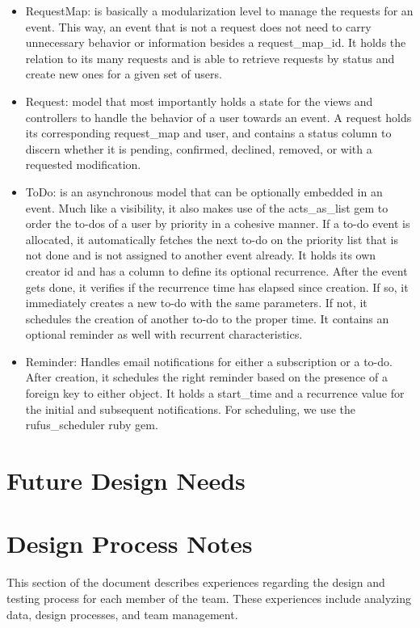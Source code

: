 \documentclass[11pt]{article}
\begin{document}
\begin{itemize}
  \item RequestMap: is basically a modularization level to manage the requests for an event. This way, an event that is not a request does not need to carry unnecessary behavior or information besides a request\_map\_id. It holds the relation to its many requests and is able to retrieve requests by status and create new ones for a given set of users.
  \item Request: model that most importantly holds a state for the views and controllers to handle the behavior of a user towards an event. A request holds its corresponding request\_map and user, and contains a status column to discern whether it is pending, confirmed, declined, removed, or with a requested modification.
  \item ToDo: is an asynchronous model that can be optionally embedded in an event. Much like a visibility, it also makes use of the acts\_as\_list gem to order the to-dos of a user by priority in a cohesive manner. If a to-do event is allocated, it automatically fetches the next to-do on the priority list that is not done and is not assigned to another event already. It holds its own creator id and has a column to define its optional recurrence. After the event gets done, it verifies if the recurrence time has elapsed since creation. If so, it immediately creates a new to-do with the same parameters. If not, it schedules the creation of another to-do to the proper time. It contains an optional reminder as well with recurrent characteristics.
  \item Reminder: Handles email notifications for either a subscription or a to-do. After creation, it schedules the right reminder based on the presence of a foreign key to either object. It holds a start\_time and a recurrence value for the initial and subsequent notifications. For scheduling, we use the rufus\_scheduler ruby gem.

\end{itemize}

\section{Future Design Needs}

\section{Design Process Notes}

This section of the document describes experiences regarding the design and testing process for each member of the team.  These experiences include analyzing data, design processes, and team management.
\end{document}
